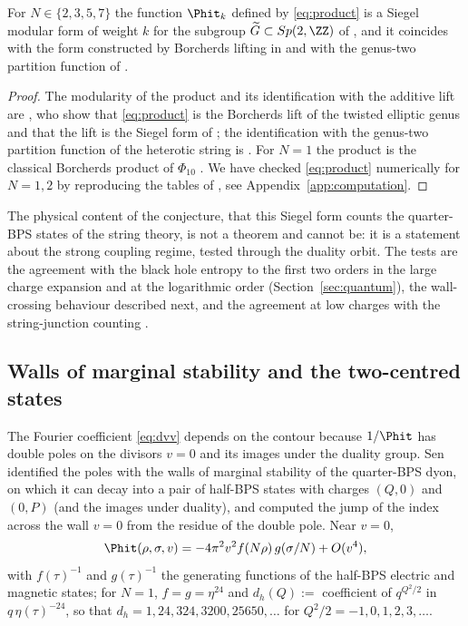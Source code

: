 \begin{theorem}[claim 6]\label{thm:chl}
For $N\in\{2,3,5,7\}$ the function $\Phit_k$ defined by \eqref{eq:product} is a Siegel modular form of weight $k$ for the subgroup $\widetilde G\subset Sp(2,\ZZ)$ of \cite{JatkarSen06}, and it coincides with the form constructed by Borcherds lifting in \cite{DabholkarNampuri07} and with the genus-two partition function of \cite{DabholkarGaiotto07}.
\end{theorem}

\begin{proof}
The modularity of the product and its identification with the additive lift are \cite[Section~3]{DabholkarNampuri07}, who show that \eqref{eq:product} is the Borcherds lift of the twisted elliptic genus and that the lift is the Siegel form of \cite{JatkarSen06}; the identification with the genus-two partition function of the heterotic string is \cite{DabholkarGaiotto07}. For $N=1$ the product is the classical Borcherds product of $\Phi_{10}$ \cite{GritsenkoNikulin97}. We have checked \eqref{eq:product} numerically for $N=1,2$ by reproducing the tables of \cite{Sen11positivity}, see Appendix~\ref{app:computation}.
\end{proof}

The physical content of the conjecture, that this Siegel form counts the quarter-BPS states of the string theory, is not a theorem and cannot be: it is a statement about the strong coupling regime, tested through the duality orbit. The tests are the agreement with the black hole entropy to the first two orders in the large charge expansion \cite{CDKM04,JatkarSen06,DavidSen06} and at the logarithmic order (Section~\ref{sec:quantum}), the wall-crossing behaviour described next, and the agreement at low charges with the string-junction counting \cite{Sen07junction}.

\subsection{Walls of marginal stability and the two-centred states}\label{ssec:walls}

The Fourier coefficient \eqref{eq:dvv} depends on the contour because $1/\Phit$ has double poles on the divisors $v=0$ and its images under the duality group. Sen \cite{Sen07walls} identified the poles with the walls of marginal stability of the quarter-BPS dyon, on which it can decay into a pair of half-BPS states with charges $(Q,0)$ and $(0,P)$ (and the images under duality), and computed the jump of the index across the wall $v=0$ from the residue of the double pole. Near $v=0$,
\begin{equation}\label{eq:nearpole}
\Phit(\rho,\sigma,v) = -4\pi^2 v^2 f(N\rho)\,g(\sigma/N) + O(v^4),
\end{equation}
with $f(\tau)^{-1}$ and $g(\tau)^{-1}$ the generating functions of the half-BPS electric and magnetic states; for $N=1$, $f=g=\eta^{24}$ and $d_h(Q) := $ coefficient of $q^{Q^2/2}$ in $q\,\eta(\tau)^{-24}$, so that $d_h = 1, 24, 324, 3200, 25650, \dots$ for $Q^2/2 = -1,0,1,2,3,\dots$.

